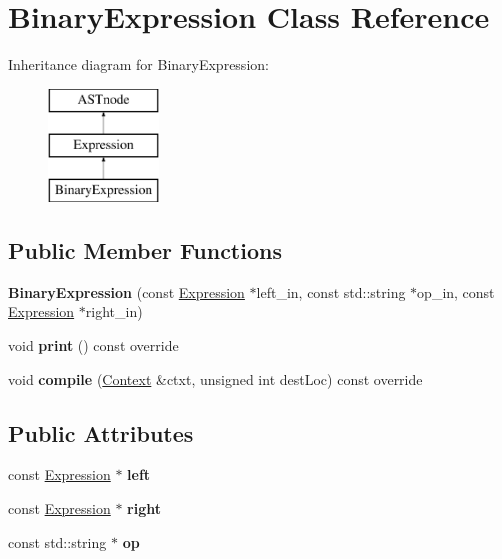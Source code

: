 \hypertarget{class_binary_expression}{}\section{Binary\+Expression Class Reference}
\label{class_binary_expression}
Inheritance diagram for Binary\+Expression\+:\begin{figure}[H]
\begin{center}
\leavevmode
\includegraphics[height=3.000000cm]{class_binary_expression}
\end{center}
\end{figure}
\subsection*{Public Member Functions}
\begin{DoxyCompactItemize}
\item 
\mbox{\label{class_binary_expression_a778ec407f2742ef33c7fe443dd8cb9bb}} 
{\bfseries Binary\+Expression} (const \hyperlink{class_expression}{Expression} $\ast$left\+\_\+in, const std\+::string $\ast$op\+\_\+in, const \hyperlink{class_expression}{Expression} $\ast$right\+\_\+in)
\item 
\mbox{\label{class_binary_expression_a3083960e3d1f7fe0015f906f20d256e9}} 
void {\bfseries print} () const override
\item 
\mbox{\label{class_binary_expression_a1eaca730f7a3fa6ff8153b23f72eb961}} 
void {\bfseries compile} (\hyperlink{class_context}{Context} \&ctxt, unsigned int dest\+Loc) const override
\end{DoxyCompactItemize}
\subsection*{Public Attributes}
\begin{DoxyCompactItemize}
\item 
\mbox{\label{class_binary_expression_a9a5f3daa86c05eace97b8ab081a29544}} 
const \hyperlink{class_expression}{Expression} $\ast$ {\bfseries left}
\item 
\mbox{\label{class_binary_expression_a1124bcd93d45cc8a2639cb1b662ad027}} 
const \hyperlink{class_expression}{Expression} $\ast$ {\bfseries right}
\item 
\mbox{\label{class_binary_expression_a085e8e782d1370dc7c0a1ae4625654b9}} 
const std\+::string $\ast$ {\bfseries op}
\end{DoxyCompactItemize}


